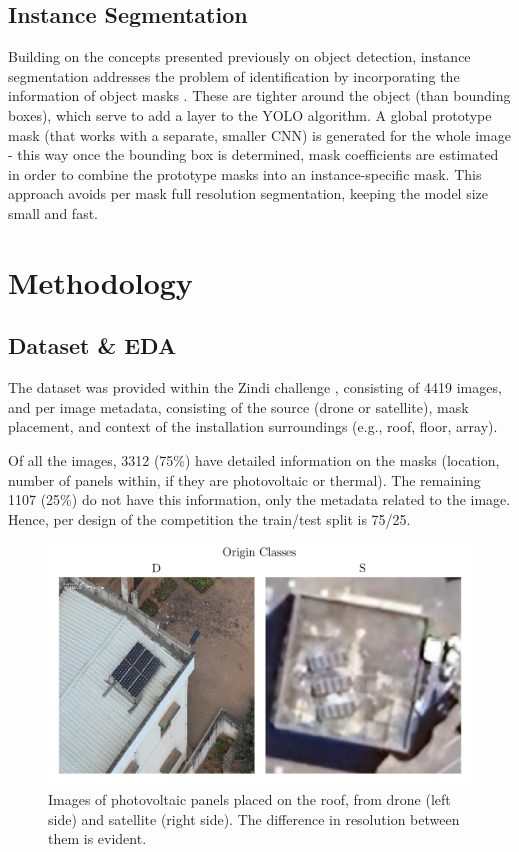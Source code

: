 \documentclass[conference]{IEEEtran}
\begin{document}
\subsection{Instance Segmentation}

Building on the concepts presented previously on object detection, instance segmentation addresses the problem of identification by incorporating the information of object masks \cite{YOLOSeg}. These are tighter around the object (than bounding boxes), which serve to add a layer to the YOLO algorithm. A global prototype mask (that works with a separate, smaller CNN) is generated for the whole image - this way once the bounding box is determined, mask coefficients are estimated in order to combine the prototype masks into an instance-specific mask. This approach avoids per mask full resolution segmentation, keeping the model size small and fast.



\section{Methodology}

\subsection{Dataset \& EDA}

The dataset was provided within the Zindi challenge \cite{zindi2025lacuna}, consisting of 4419 images, and per image metadata, consisting of the source (drone or satellite), mask placement, and context of the installation surroundings (e.g., roof, floor, array).

Of all the images, 3312 (75\%) have detailed information on the masks (location, number of panels within, if they are photovoltaic or thermal). The remaining 1107 (25\%) do not have this information, only the metadata related to the image. Hence, per design of the competition the train/test split is 75/25.

\begin{figure}[H]
    \centering
    \includegraphics[width=1\linewidth]{assets/data_origin_classes.png}
    \caption{Images of photovoltaic panels placed on the roof, from drone (left side) and satellite (right side). The difference in resolution between them is evident.}
    \label{fig:data_origin_classes}
\end{figure}
\end{document}
